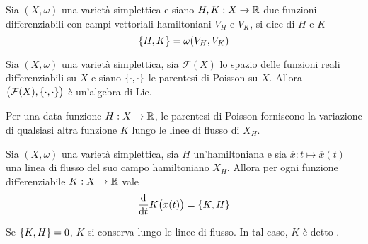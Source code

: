 \begin{definition}
  Sia $(X, \omega)$ una varietà simplettica e siano $H,K: X \to \mathbb{R}$ due funzioni differenziabili con campi vettoriali hamiltoniani $V_H$ e $V_K$, si dice  di $H$ e $K$ \begin{equation*}
  \pb{H}{K} = \omega(V_H,V_K) 
  \end{equation*} 
\end{definition}
\begin{theorem}
  Sia $(X, \omega)$ una varietà simplettica, sia $\mathcal{F}(X)$ lo spazio delle funzioni reali differenziabili su $X$ e siano $\pb{\cdot}{\cdot}$ le parentesi di Poisson su $X$. Allora $\big(\mathcal{F}(X), \pb{\cdot}{\cdot}\big)$ è un'algebra di Lie.
\end{theorem}

Per una data funzione $H:X\to \mathbb{R}$, le parentesi di Poisson forniscono la variazione di qualsiasi altra funzione $K$ lungo le linee di flusso di $X_H$.
\begin{theorem}
  Sia $(X, \omega)$ una varietà simplettica, sia $H$ un'hamiltoniana e sia $\overline{x}:t \mapsto \overline{x}(t)$ una linea di flusso del suo campo hamiltoniano $X_H$. Allora per ogni funzione differenziabile $K:X\to \mathbb{R}$ vale \begin{equation*}
  \dv{t} K\big(\overline{x}(t)\big) = \pb{K}{H}
  \end{equation*}  
\end{theorem}
\begin{corollary}
  Se $\pb{K}{H} = 0$, $K$ si conserva lungo le linee di flusso. In tal caso, $K$ è detto .
\end{corollary}

